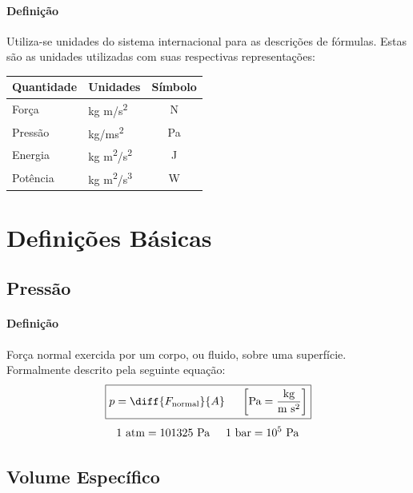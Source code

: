 \documentclass{article}
\begin{document}
            \paragraph{Definição}Utiliza-se unidades do sistema internacional para as descrições de fórmulas. Estas são as unidades utilizadas com suas respectivas representações:
                \begin{table}[h]
                    \centering
                    \begin{tabular}{llc}\hline
                        Quantidade & Unidades                                     & Símbolo\\[1mm]\hline
                        Força      & kg m/s\textsuperscript{2}                    & N\\
                        Pressão    & kg/ms\textsuperscript{2}                    & Pa\\
                        Energia    & kg m\textsuperscript{2}/s\textsuperscript{2} & J\\
                        Potência   & kg m\textsuperscript{2}/s\textsuperscript{3} & W\\\hline
                    \end{tabular}
                \end{table}
\newpage

    \section{Definições Básicas}
        \subsection{Pressão}
            \paragraph{Definição}Força normal exercida por um corpo, ou fluido, sobre uma superfície. Formalmente descrito pela seguinte equação:
                \[\boxed{p = \diff{F_{\text{normal}}}{A} \hspace{5mm} \left[\text{Pa} = \frac{\text{kg}}{\text{m}\text{ s}^{2}}\right]}\]
                \[1 \text{ atm} = 101325 \text{ Pa} \hspace{5mm} 1 \text{ bar} = 10^5 \text{ Pa}\]

        \subsection{Volume Específico}
\end{document}

